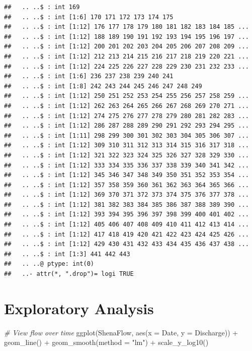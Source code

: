 \documentclass[
  12pt,
]{article}
\newenvironment{Shaded}{\begin{snugshade}}{\end{snugshade}}
\newcommand{\AttributeTok}[1]{\textcolor[rgb]{0.77,0.63,0.00}{#1}}
\newcommand{\CommentTok}[1]{\textcolor[rgb]{0.56,0.35,0.01}{\textit{#1}}}
\newcommand{\FunctionTok}[1]{\textcolor[rgb]{0.00,0.00,0.00}{#1}}
\newcommand{\NormalTok}[1]{#1}
\newcommand{\SpecialCharTok}[1]{\textcolor[rgb]{0.00,0.00,0.00}{#1}}
\newcommand{\StringTok}[1]{\textcolor[rgb]{0.31,0.60,0.02}{#1}}
\begin{document}
\begin{verbatim}
##   .. ..$ : int 169
##   .. ..$ : int [1:6] 170 171 172 173 174 175
##   .. ..$ : int [1:12] 176 177 178 179 180 181 182 183 184 185 ...
##   .. ..$ : int [1:12] 188 189 190 191 192 193 194 195 196 197 ...
##   .. ..$ : int [1:12] 200 201 202 203 204 205 206 207 208 209 ...
##   .. ..$ : int [1:12] 212 213 214 215 216 217 218 219 220 221 ...
##   .. ..$ : int [1:12] 224 225 226 227 228 229 230 231 232 233 ...
##   .. ..$ : int [1:6] 236 237 238 239 240 241
##   .. ..$ : int [1:8] 242 243 244 245 246 247 248 249
##   .. ..$ : int [1:12] 250 251 252 253 254 255 256 257 258 259 ...
##   .. ..$ : int [1:12] 262 263 264 265 266 267 268 269 270 271 ...
##   .. ..$ : int [1:12] 274 275 276 277 278 279 280 281 282 283 ...
##   .. ..$ : int [1:12] 286 287 288 289 290 291 292 293 294 295 ...
##   .. ..$ : int [1:11] 298 299 300 301 302 303 304 305 306 307 ...
##   .. ..$ : int [1:12] 309 310 311 312 313 314 315 316 317 318 ...
##   .. ..$ : int [1:12] 321 322 323 324 325 326 327 328 329 330 ...
##   .. ..$ : int [1:12] 333 334 335 336 337 338 339 340 341 342 ...
##   .. ..$ : int [1:12] 345 346 347 348 349 350 351 352 353 354 ...
##   .. ..$ : int [1:12] 357 358 359 360 361 362 363 364 365 366 ...
##   .. ..$ : int [1:12] 369 370 371 372 373 374 375 376 377 378 ...
##   .. ..$ : int [1:12] 381 382 383 384 385 386 387 388 389 390 ...
##   .. ..$ : int [1:12] 393 394 395 396 397 398 399 400 401 402 ...
##   .. ..$ : int [1:12] 405 406 407 408 409 410 411 412 413 414 ...
##   .. ..$ : int [1:12] 417 418 419 420 421 422 423 424 425 426 ...
##   .. ..$ : int [1:12] 429 430 431 432 433 434 435 436 437 438 ...
##   .. ..$ : int [1:3] 441 442 443
##   .. ..@ ptype: int(0) 
##   ..- attr(*, ".drop")= logi TRUE
\end{verbatim}

\newpage

\hypertarget{exploratory-analysis}{%
\section{Exploratory Analysis}\label{exploratory-analysis}}

\begin{Shaded}
\begin{Highlighting}[]
\CommentTok{\# View flow over time}
\FunctionTok{ggplot}\NormalTok{(ShenaFlow, }\FunctionTok{aes}\NormalTok{(}\AttributeTok{x =}\NormalTok{ Date, }\AttributeTok{y =}\NormalTok{ Discharge)) }\SpecialCharTok{+}
  \FunctionTok{geom\_line}\NormalTok{() }\SpecialCharTok{+}
  \FunctionTok{geom\_smooth}\NormalTok{(}\AttributeTok{method =} \StringTok{"lm"}\NormalTok{) }\SpecialCharTok{+}
  \FunctionTok{scale\_y\_log10}\NormalTok{()}
\end{Highlighting}
\end{Shaded}
\end{document}
